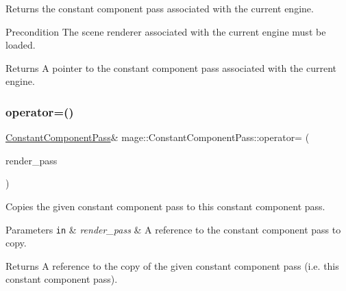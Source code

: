 Returns the constant component pass associated with the current engine.

\begin{DoxyPrecond}{Precondition}
The scene renderer associated with the current engine must be loaded. 
\end{DoxyPrecond}
\begin{DoxyReturn}{Returns}
A pointer to the constant component pass associated with the current engine. 
\end{DoxyReturn}
\hypertarget{classmage_1_1_constant_component_pass_a513b83527fdb17a760032b76f3c17012}{}\label{classmage_1_1_constant_component_pass_a513b83527fdb17a760032b76f3c17012} 
\subsubsection{\texorpdfstring{operator=()}{operator=()}\hspace{0.1cm}{\footnotesize\ttfamily [1/2]}}
{\footnotesize\ttfamily \hyperlink{classmage_1_1_constant_component_pass}{Constant\+Component\+Pass}\& mage\+::\+Constant\+Component\+Pass\+::operator= (\begin{DoxyParamCaption}\item[{const \hyperlink{classmage_1_1_constant_component_pass}{Constant\+Component\+Pass} \&}]{render\+\_\+pass }\end{DoxyParamCaption})\hspace{0.3cm}{\ttfamily [delete]}}

Copies the given constant component pass to this constant component pass.


\begin{DoxyParams}[1]{Parameters}
\mbox{\tt in}  & {\em render\+\_\+pass} & A reference to the constant component pass to copy. \\
\hline
\end{DoxyParams}
\begin{DoxyReturn}{Returns}
A reference to the copy of the given constant component pass (i.\+e. this constant component pass). 
\end{DoxyReturn}
\hypertarget{classmage_1_1_constant_component_pass_ab1944cfe6c59d28d34fb6c6d05bd0b96}{}\label{classmage_1_1_constant_component_pass_ab1944cfe6c59d28d34fb6c6d05bd0b96} 
